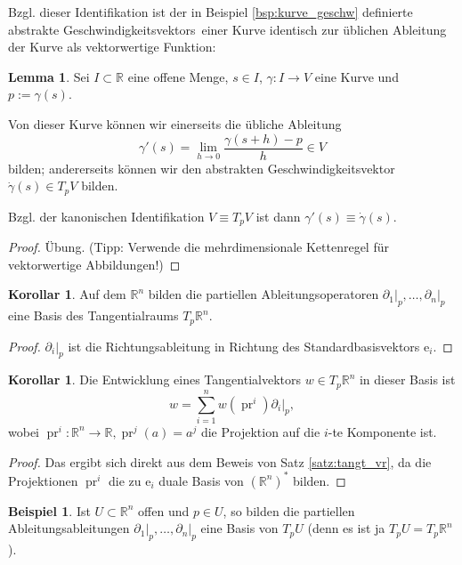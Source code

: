 \documentclass[a4paper]{scrbook}
\numberwithin{equation}{chapter}
\newcommand{\e}{\mathrm{e}}
\DeclareMathOperator{\pr}{pr}
\newcommand{\R}{\mathbb{R}}
\theoremstyle{definition}
\newtheorem{lemma}[defn]{Lemma}
\newtheorem{kor}[defn]{Korollar}
\newtheorem{bsp}[defn]{Beispiel}
\begin{document}
Bzgl. dieser Identifikation ist der in Beispiel \ref{bsp:kurve_geschw} definierte abstrakte \glqq Geschwindigkeitsvektors\grqq\ einer Kurve identisch zur üblichen Ableitung der Kurve als vektorwertige Funktion:
\begin{lemma}
	Sei $I\subset \R$ eine offene Menge, $s\in I$, $\gamma\colon I\to V$ eine Kurve und $p := \gamma(s)$.

	Von dieser Kurve können wir einerseits die übliche Ableitung
	\[\gamma'(s) = \lim_{h\to 0} \frac{\gamma(s+h) - p}{h} \in V\]
	bilden; andererseits können wir den abstrakten Geschwindigkeitsvektor $\dot\gamma(s) \in T_pV$ bilden.

	Bzgl. der kanonischen Identifikation $V \equiv T_pV$ ist dann $\gamma'(s) \equiv \dot\gamma(s)$.

	\begin{proof}
		Übung. (Tipp: Verwende die mehrdimensionale Kettenregel für vektorwertige Abbildungen!)
	\end{proof}
\end{lemma}

\begin{kor}
	Auf dem $\mathbb R^n$ bilden die partiellen Ableitungsoperatoren $\left.\partial_1\right|_p, \dots, \left.\partial_n\right|_p$ eine Basis des Tangentialraums $T_p\mathbb R^n$.

	\begin{proof}
		$\left.\partial_i\right|_p$ ist die Richtungsableitung in Richtung des Standardbasisvektors $\e_i$.
	\end{proof}
\end{kor}

\begin{kor} \label{kor:entw_tangt_Rn}
	Die Entwicklung eines Tangentialvektors $w \in T_p\mathbb R^n$ in dieser Basis ist
	\[w = \sum_{i=1}^n w(\pr^i) \left.\partial_i\right|_p,\]
	wobei $\pr^i\colon \mathbb R^n \to \mathbb R, \pr^j(a) = a^j$ die Projektion auf die $i$-te Komponente ist.

	\begin{proof}
		Das ergibt sich direkt aus dem Beweis von Satz \ref{satz:tangt_vr}, da die Projektionen $\pr^i$ die zu $\e_i$ duale Basis von $(\mathbb R^n)^*$ bilden.
	\end{proof}
\end{kor}

\begin{bsp}
	Ist $U\subset\mathbb R^n$ offen und $p\in U$, so bilden die partiellen Ableitungsableitungen $\left.\partial_1\right|_p, \dots, \left.\partial_n\right|_p$ eine Basis von $T_pU$ (denn es ist ja $T_pU = T_p\mathbb R^n$).
\end{bsp}
\end{document}
